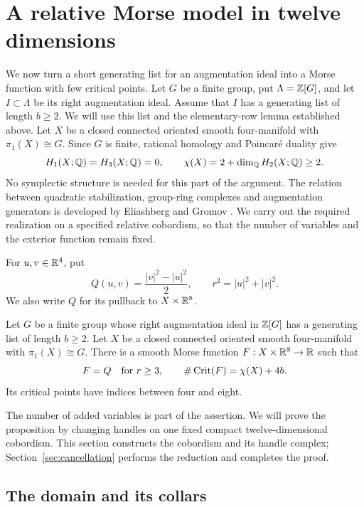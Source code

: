 \section{A relative Morse model in twelve dimensions}
\label{sec:relative-model}

We now turn a short generating list for an augmentation ideal into a Morse
function with few critical points.  Let $G$ be a finite group, put
$\Lambda=\mathbb Z[G]$, and let $I\subset\Lambda$ be its right augmentation ideal.
Assume that $I$ has a generating list of length $b\geq2$.
We will use this list and the elementary-row lemma established above.
Let $X$ be a closed connected oriented smooth four-manifold with
$\pi_1(X)\cong G$.  Since $G$ is finite, rational homology and Poincar\'e
duality give
\[
 H_1(X;\mathbb Q)=H_3(X;\mathbb Q)=0,
 \qquad \chi(X)=2+\dim_{\mathbb Q}H_2(X;\mathbb Q)\geq 2.
\]
No symplectic structure is needed for this part of the argument.
The relation between quadratic stabilization, group-ring complexes and
augmentation generators is developed by Eliashberg and Gromov
\cite[Sections~0.2.2 and~0.2.5]{EliashbergGromov1998}.
We carry out the required realization on a specified relative cobordism,
so that the number of variables and the exterior function remain fixed.

For $u,v\in\mathbb R^4$, put
\begin{equation}
 Q(u,v)=\frac{|v|^2-|u|^2}{2},
 \qquad r^2=|u|^2+|v|^2.
 \label{eq:quadratic}
\end{equation}
We also write $Q$ for its pullback to $X\times\mathbb R^8$.

\begin{proposition}
\label{prop:relative-morse}
Let $G$ be a finite group whose right augmentation ideal in $\mathbb Z[G]$
has a generating list of length $b\geq2$.
Let $X$ be a closed connected oriented smooth four-manifold with
$\pi_1(X)\cong G$.
There is a smooth Morse function $F:X\times\mathbb R^8\to\mathbb R$ such that
\[
 F=Q\quad\text{for }r\geq 3,
 \qquad
 \#\operatorname{Crit}(F)=\chi(X)+4b.
\]
Its critical points have indices between four and eight.
\end{proposition}

The number of added variables is part of the assertion.  We will prove the
proposition by changing handles on one fixed compact twelve-dimensional
cobordism.  This section constructs the cobordism and its handle complex;
Section~\ref{sec:cancellation} performs the reduction and completes the proof.

\subsection{The domain and its collars}

